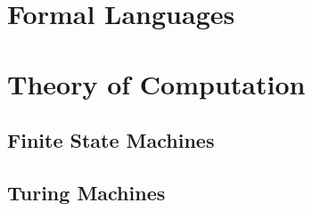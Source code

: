 
\section{Formal Languages}











\section{Theory of Computation}

\subsection{Finite State Machines}

\subsection{Turing Machines}

